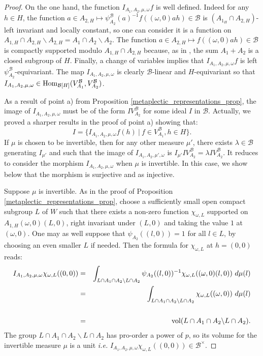 \documentclass[11pt]{article}
\theoremstyle{plain}
\theoremstyle{definition}
\theoremstyle{plain}
\theoremstyle{definition}
\theoremstyle{plain}
\begin{document}
\begin{proof} On the one hand, the function $I_{A_1,A_2,\mu,\omega} f$ is well defined. Indeed for any $h \in H$, the function $a \in A_{2,H} \mapsto \psi_{A_2}^\mathcal{B}(a)^{-1} f((\omega,0)ah) \in \mathcal{B}$ is $(A_{1_H} \cap A_{2,H})$-left invariant and locally constant, so one can consider it is a function on $A_{1,H} \cap A_{2,H} \backslash A_{2,H} = A_1 \cap A_2 \backslash A_2$. The function $a \in A_{2,H} \mapsto f((\omega,0) a h) \in \mathcal{B}$ is compactly supported modulo $A_{1,H} \cap A_{2,H}$ because, as in \cite[Sec. 2.3]{trias_theta1}, the sum $A_1 + A_2$ is a closed subgroup of $H$. Finally, a change of variables implies that $I_{A_1,A_2,\mu,\omega} f$ is left $\psi_{A_2}^\mathcal{B}$-equivariant. The map $I_{A_1,A_2,\mu,\omega}$ is clearly $\mathcal{B}$-linear and $H$-equivariant so that $I_{A_1,A_2,\mu,\omega} \in \textup{Hom}_{\mathcal{B}[H]}(V_{A_1}^\mathcal{B}, V_{A_2}^\mathcal{B})$.

As a result of point a) from Proposition \ref{metaplectic_representations_prop}, the image of $I_{A_1,A_2,\mu,\omega}$ must be of the form $I V_{A_2}^\mathcal{B}$ for some ideal $I$ in $\mathcal{B}$. Actually, we proved a sharper results in the proof of point a) showing that:
$$I=\{ I_{A_1,A_2,\mu,\omega} f (h) \ | \ f \in V_{A_1}^\mathcal{B}, h \in H \}.$$
If $\mu$ is chosen to be invertible, then for any other measure $\mu'$, there exists $\lambda \in \mathcal{B}$ generating $I_{\mu'}$ and such that the image of $I_{A_1,A_2,\mu',\omega}$ is $I_{\mu'} I V_{A_2}^\mathcal{B} = \lambda I V_{A_2}^\mathcal{B}$. It reduces to consider the morphism $I_{A_1,A_2,\mu,\omega}$ when $\mu$ is invertible. In this case, we show below that the morphism is surjective and as injective.

Suppose $\mu$ is invertible. As in the proof of Proposition \ref{metaplectic_representations_prop}, choose a sufficiently small open compact subgroup $L$ of $W$ such that there exists a non-zero function $\chi_{\omega,L}$ supported on $A_{1,H} (\omega,0) (L,0)$, right invariant under $(L,0)$ and taking the value $1$ at $(\omega,0)$. One may as well suppose that $\psi_{A_2}((l,0)) = 1$ for all $l \in L$, by choosing an even smaller $L$ if needed. Then the formula for $\chi_{\omega,L}$ at $h=(0,0)$ reads:
\begin{eqnarray*} I_{A_1,A_2,\mu,\omega} \chi_{\omega,L}((0,0)) &=& \int_{L \cap A_1 \cap A_2 \backslash L \cap A_2} \psi_{A_2}((l,0))^{-1} \chi_{\omega,L}((\omega,0) (l,0) ) \ d\mu(l) \\
&=& \int_{L\cap A_1 \cap A_2 \backslash L \cap A_2} \chi_{\omega,L}((\omega,0)) \ d\mu(l) \\
& & \\
&=& \textup{vol}(L\cap A_1 \cap A_2 \backslash L \cap A_2). \end{eqnarray*}
The group $L \cap A_1 \cap A_2 \backslash L \cap A_2$ has pro-order a power of $p$, so its volume for the invertible measure $\mu$ is a unit \textit{i.e.} $I_{A_1,A_2,\mu,\omega} \chi_{\omega,L}((0,0)) \in \mathcal{B}^\times$.



\end{proof}
\end{document}
